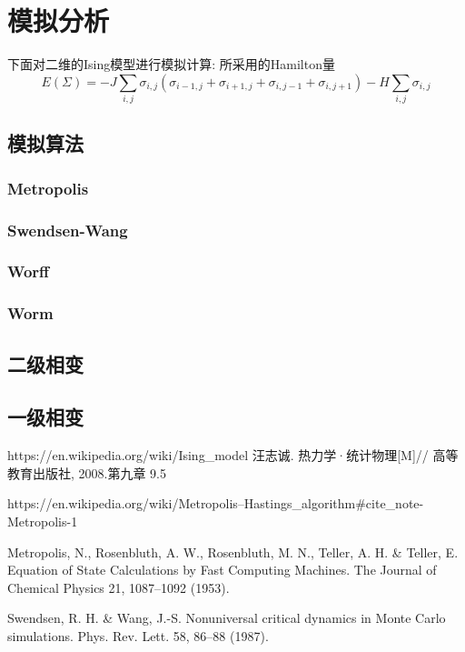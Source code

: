 \documentclass[12pt]{article} %
\begin{document}
\section{模拟分析}
下面对二维的Ising模型进行模拟计算:
所采用的Hamilton量
\begin{equation}
\label{equ: Hamilton_2D}
E(\Sigma) = -J\sum_{i,j}\sigma_{i,j}(\sigma_{i-1,j}+\sigma_{i+1,j}+\sigma_{i,j-1}+\sigma_{i,j+1}) - H\sum_{i,j}\sigma_{i,j}
\end{equation}

\subsection{模拟算法}
\subsubsection{Metropolis}
\cite{Metropolis_wiki}
\cite{Metropolis:1953vj}
\subsubsection{Swendsen-Wang}
\cite{Swendsen:1987eq}
\subsubsection{Worff}
\subsubsection{Worm}


\subsection{二级相变}

\subsection{一级相变}


\renewcommand\refname{参考文献}
\begin{thebibliography}{99}
        https://en.wikipedia.org/wiki/Ising\_model
        汪志诚. 热力学·统计物理[M]// 高等教育出版社, 2008.第九章 9.5

        https://en.wikipedia.org/wiki/Metropolis–Hastings\_algorithm\#cite\_note-Metropolis-1

        Metropolis, N., Rosenbluth, A. W., Rosenbluth, M. N., Teller, A. H. \& Teller, E. Equation of State Calculations by Fast Computing Machines. The Journal of Chemical Physics 21, 1087–1092 (1953).

        Swendsen, R. H. \& Wang, J.-S. Nonuniversal critical dynamics in Monte Carlo simulations. Phys. Rev. Lett. 58, 86–88 (1987).

\end{thebibliography}
\end{document}
